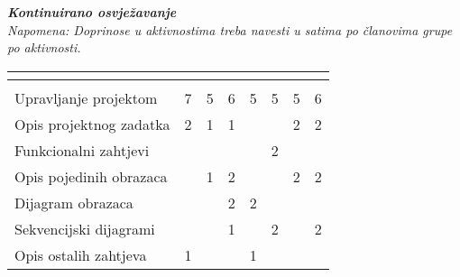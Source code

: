 			\textbf{\textit{Kontinuirano osvježavanje}}\\
			
			 \textit{Napomena: Doprinose u aktivnostima treba navesti u satima po članovima grupe po aktivnosti.}
					
						
			
			\begin{longtabu} to \textwidth {|X[7, l]|X[1, c]|X[1, c]|X[1, c]|X[1, c]|X[1, c]|X[1, c]|X[1, c]|}
								
				  &      &  &	 &	 &
				 &
				 &	 \\ \hline 
				\endfirsthead
				
			
				  &      &  &	 &
				 &	 &
				 &	 \\ \hline 
				\endhead
				
				
				\endfoot
							
				 
				\endlastfoot
				
				Upravljanje projektom 		& 7 & 5 & 6 & 5 & 5 & 5 & 6 \\ \hline
				Opis projektnog zadatka 	& 2 & 1 & 1 &  &  & 2 & 2 \\ \hline
				
				Funkcionalni zahtjevi       &  &  &  &  & 2 &  &  \\ \hline
				Opis pojedinih obrazaca 	&  & 1 & 2 &  &  & 2 & 2 \\ \hline
				Dijagram obrazaca 			&  &  & 2 & 2 &  &  &  \\ \hline
				Sekvencijski dijagrami 		&  &  & 1 &  & 2 &  & 2 \\ \hline
				Opis ostalih zahtjeva 		& 1 &  &  & 1 &  &  &  \\ \hline


\end{longtabu}
